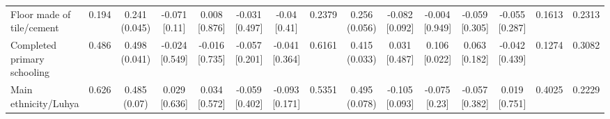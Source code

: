 {\begin{tabular}[t]{lcccccccccccccc}
\addlinespace[0.3em]
\hline
\multicolumn{15}{l}{\textit{\textbf{Panel B: Baseline demographics, $N=2,407$}}}\\
\hline
\hspace{1em}Floor made of tile/cement & 0.194 & \makecell[c]{0.241\\(0.045)} & \makecell[c]{-0.071\\{[0.11]}} & \makecell[c]{0.008\\{[0.876]}} & \makecell[c]{-0.031\\{[0.497]}} & \makecell[c]{-0.04\\{[0.41]}} & 0.2379 & \makecell[c]{0.256\\(0.056)} & \makecell[c]{-0.082\\{[0.092]}} & \makecell[c]{-0.004\\{[0.949]}} & \makecell[c]{-0.059\\{[0.305]}} & \makecell[c]{-0.055\\{[0.287]}} & 0.1613 & 0.2313\\
\hspace{1em}Completed primary schooling & 0.486 & \makecell[c]{0.498\\(0.041)} & \makecell[c]{-0.024\\{[0.549]}} & \makecell[c]{-0.016\\{[0.735]}} & \makecell[c]{-0.057\\{[0.201]}} & \makecell[c]{-0.041\\{[0.364]}} & 0.6161 & \makecell[c]{0.415\\(0.033)} & \makecell[c]{0.031\\{[0.487]}} & \makecell[c]{0.106\\{[0.022]}} & \makecell[c]{0.063\\{[0.182]}} & \makecell[c]{-0.042\\{[0.439]}} & 0.1274 & 0.3082\\
\hspace{1em}Main ethnicity/Luhya & 0.626 & \makecell[c]{0.485\\(0.07)} & \makecell[c]{0.029\\{[0.636]}} & \makecell[c]{0.034\\{[0.572]}} & \makecell[c]{-0.059\\{[0.402]}} & \makecell[c]{-0.093\\{[0.171]}} & 0.5351 & \makecell[c]{0.495\\(0.078)} & \makecell[c]{-0.105\\{[0.093]}} & \makecell[c]{-0.075\\{[0.23]}} & \makecell[c]{-0.057\\{[0.382]}} & \makecell[c]{0.019\\{[0.751]}} & 0.4025 & 0.2229\\

\end{tabular}}
